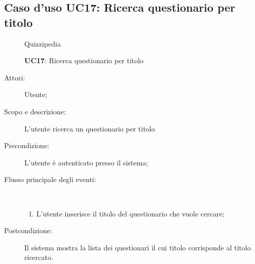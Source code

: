 \subsection{Caso d'uso UC17: Ricerca questionario per titolo}
	\begin{figure}[H]
		\centering
		\begin{resizedtikzpicture}{\textwidth}
		\begin{umlsystem}[x=0, fill=lightgray!20]{Quizzipedia}
		\end{umlsystem}
		\end{resizedtikzpicture}
		\caption{\textbf{UC17}: Ricerca questionario per titolo}
		\label{UC17}
	\end{figure}
\begin{description}
\item[Attori:] Utente;
\item[Scopo e descrizione:] L'utente ricerca un questionario per titolo
      \item[Precondizione:] L'utente è autenticato presso il sistema;

        \item[Flusso principale degli eventi:] \ 
 \begin{enumerate}
          \item L'utente inserisce il titolo del questionario che vuole cercare;

      \end{enumerate}
    \item[Postcondizione:] Il sistema mostra la lista dei questionari il cui titolo corrisponde al titolo ricercato.
  \end{description}
\hypertarget{UC18}{}
